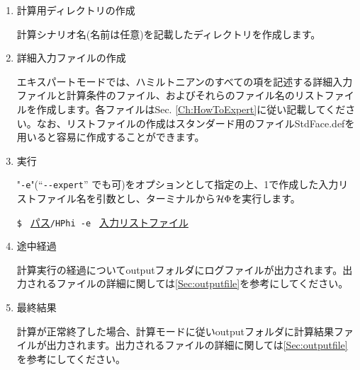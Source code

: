  \begin{enumerate}
   \item  計算用ディレクトリの作成

計算シナリオ名(名前は任意)を記載したディレクトリを作成します。

   \item  詳細入力ファイルの作成

エキスパートモードでは、ハミルトニアンのすべての項を記述する詳細入力ファイルと計算条件のファイル、およびそれらのファイル名のリストファイルを作成します。各ファイルはSec. \ref{Ch:HowToExpert}に従い記載してください。なお、リストファイルの作成はスタンダード用のファイルStdFace.defを用いると容易に作成することができます。

 \item  実行

"\verb|-e|"(``\verb|--expert|'' でも可)をオプションとして指定の上、1で作成した入力リストファイル名を引数とし、ターミナルから$\mathcal{H} \Phi$を実行します。

\verb|$ | \underline{パス}\verb|/HPhi -e | \underline{入力リストファイル}

\item 途中経過

計算実行の経過についてoutputフォルダにログファイルが出力されます。出力されるファイルの詳細に関しては\ref{Sec:outputfile}を参考にしてください。

\item 最終結果

計算が正常終了した場合、計算モードに従いoutputフォルダに計算結果ファイルが出力されます。出力されるファイルの詳細に関しては\ref{Sec:outputfile}を参考にしてください。
\end{enumerate}

